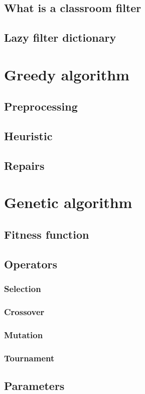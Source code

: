 \subsection{What is a classroom filter}

\subsection{Lazy filter dictionary}



\section{Greedy algorithm}


\subsection{Preprocessing}

\subsection{Heuristic}

\subsection{Repairs}



\section{Genetic algorithm}


\subsection{Fitness function}

\subsection{Operators}

\subsubsection{Selection}

\subsubsection{Crossover}

\subsubsection{Mutation}

\subsubsection{Tournament}

\subsection{Parameters}


